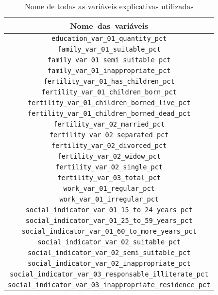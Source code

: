 \begin{table}[h] 
\centering
\caption{Nome de todas as variáveis explicativas utilizadas}
\label{tab:cap2_todas_variaveis}
\begin{tabular}{c}
\mbox{Nome das variáveis} \\
\hline
\scriptsize \verb|education_var_01_quantity_pct| \\
\scriptsize \verb|family_var_01_suitable_pct| \\
\scriptsize \verb|family_var_01_semi_suitable_pct| \\
\scriptsize \verb|family_var_01_inappropriate_pct| \\
\scriptsize \verb|fertility_var_01_has_children_pct| \\
\scriptsize \verb|fertility_var_01_children_born_pct| \\
\scriptsize \verb|fertility_var_01_children_borned_live_pct| \\
\scriptsize \verb|fertility_var_01_children_borned_dead_pct| \\
\scriptsize \verb|fertility_var_02_married_pct| \\
\scriptsize \verb|fertility_var_02_separated_pct| \\
\scriptsize \verb|fertility_var_02_divorced_pct| \\
\scriptsize \verb|fertility_var_02_widow_pct| \\
\scriptsize \verb|fertility_var_02_single_pct| \\
\scriptsize \verb|fertility_var_03_total_pct| \\
\scriptsize \verb|work_var_01_regular_pct| \\
\scriptsize \verb|work_var_01_irregular_pct| \\
\scriptsize \verb|social_indicator_var_01_15_to_24_years_pct| \\
\scriptsize \verb|social_indicator_var_01_25_to_59_years_pct| \\
\scriptsize \verb|social_indicator_var_01_60_to_more_years_pct| \\
\scriptsize \verb|social_indicator_var_02_suitable_pct| \\
\scriptsize \verb|social_indicator_var_02_semi_suitable_pct| \\
\scriptsize \verb|social_indicator_var_02_inappropriate_pct| \\
\scriptsize \verb|social_indicator_var_03_responsable_illiterate_pct| \\
\scriptsize \verb|social_indicator_var_03_inappropriate_residence_pct| \\

\end{tabular}
\end{table}
